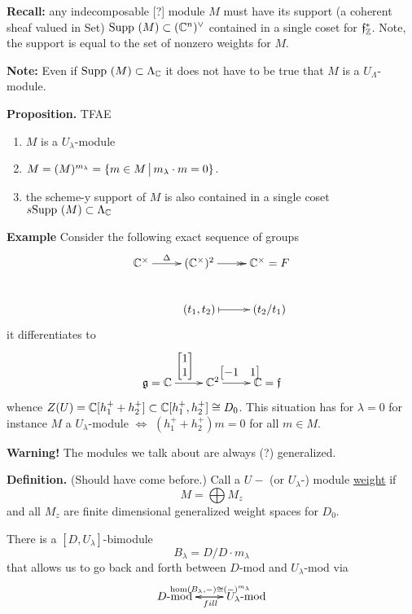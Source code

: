 \textbf{Recall:} any indecomposable [?] module $M$ must have its support (a coherent sheaf valued in Set) ${\rm Supp ~}(M)\subset (\mathbb{C}^n)^\vee$ contained in a single coset for $\mathfrak{f}_{\mathbb{Z}}^\ast$. Note, the support is equal to the set of nonzero weights for $M$.

\textbf{Note:} Even if ${\rm Supp ~}(M) \subset \Lambda_{\mathbb{C}}$ it does not have to be true that $M$ is a $U_\Lambda$-module. 

\textbf{Proposition.} TFAE
\begin{enumerate}
    \item $M$ is a $U_\lambda$-module 
    \item $M = (M)^{m_\lambda} = \{m \in M \,\big|\, m_\lambda \cdot m = 0\}$. 
    \item the scheme-y support of $M$ is also contained in a single coset $s{\rm Supp ~}(M)\subset\Lambda_{\mathbb{C}}$ 
\end{enumerate}

\textbf{Example} 
Consider the following exact sequence of groups
\[
    \xymatrix{\C^\times \ar[r]^-{\Delta} & (\C^\times)^2 \ar@{->>}[r] & \C^\times = F \\ & (t_1,t_2) \ar@{|->}[r] & (t_2/t_1) }    
\]
it differentiates to 
\[
    \xymatrix{
    \g = \C \ar[r]^{\begin{bmatrix}1 \\ 1\end{bmatrix}} & \C^2 \ar[r]^{\begin{bmatrix}-1 & 1\end{bmatrix}} & \C = \ff
    }    
\]
whence $Z(U) = \mathbb{C}[h_1^+ + h_2^+]\subset \mathbb{C}[h_1^+,h_2^+]\cong D_0$. 
This situation has for $\lambda = 0$ for instance $M$ a $U_\lambda$-module $\iff$ $(h_1^+ + h_2^+)m = 0$ for all $m \in M$. 

\textbf{Warning!} The modules we talk about are always (?) generalized. 

\textbf{Definition.} (Should have come before.) Call a $U-$ (or $U_\lambda$-) module \underline{weight} if 
\[ M = \bigoplus M_z \] and all $M_z$ are finite dimensional generalized weight spaces for $D_0$. 

There is a $[D,U_\lambda]$-bimodule
\[B_\lambda = D/D\cdot m_\lambda\] that allows us to go back and forth between $D$-mod and $U_\lambda$-mod via 
\[\xymatrix{
    D\textrm{-mod}\ar[r]^{\hom(B_\lambda, - )\cong (-)^{m_\lambda}} & U_\lambda\textrm{-mod} \ar[l]^{fill}
}\]



